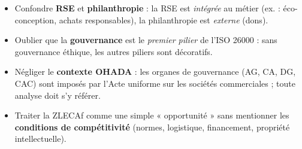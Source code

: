 \documentclass[11pt]{article}
\begin{document}
\begin{attention}
\begin{itemize}
    \item Confondre \textbf{RSE} et \textbf{philanthropie} : la RSE est \emph{intégrée} au métier (ex. : éco-conception, achats responsables), la philanthropie est \emph{externe} (dons).
    \item Oublier que la \textbf{gouvernance} est le \emph{premier pilier} de l'ISO 26000 : sans gouvernance éthique, les autres piliers sont décoratifs.
    \item Négliger le \textbf{contexte OHADA} : les organes de gouvernance (AG, CA, DG, CAC) sont imposés par l'Acte uniforme sur les sociétés commerciales ; toute analyse doit s'y référer.
    \item Traiter la ZLECAf comme une simple « opportunité » sans mentionner les \textbf{conditions de compétitivité} (normes, logistique, financement, propriété intellectuelle).
\end{itemize}
\end{attention}
\end{document}
